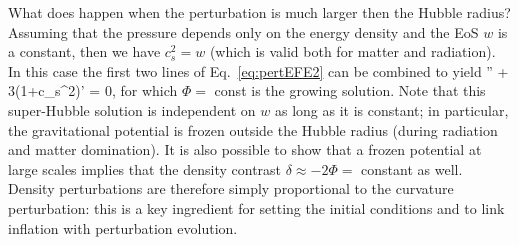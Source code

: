 What does happen when the perturbation is much larger then the Hubble radius? 
Assuming that the pressure depends only on the energy density and the EoS $w$ is a constant, then we have $c_s^2 = w$ (which is valid both for matter and radiation). In this case the first two lines of 
Eq.~\eqref{eq:pertEFE2} can be combined to yield 
%
\be
\Phi'' + 3(1+c_s^2)\Phi' = 0,
\ee
%
for which $\Phi =$ const is the growing solution. Note that this super-Hubble solution is independent on 
$w$ as long as it is constant; in particular, the gravitational potential is frozen outside the Hubble radius
(during radiation and matter domination). It is also possible to show that a frozen potential at large 
scales implies that the density contrast $\delta \approx -2\Phi =$ constant as well. Density perturbations
are therefore simply proportional to the curvature perturbation: this is a key ingredient for setting the 
initial conditions and to link inflation with perturbation evolution.

